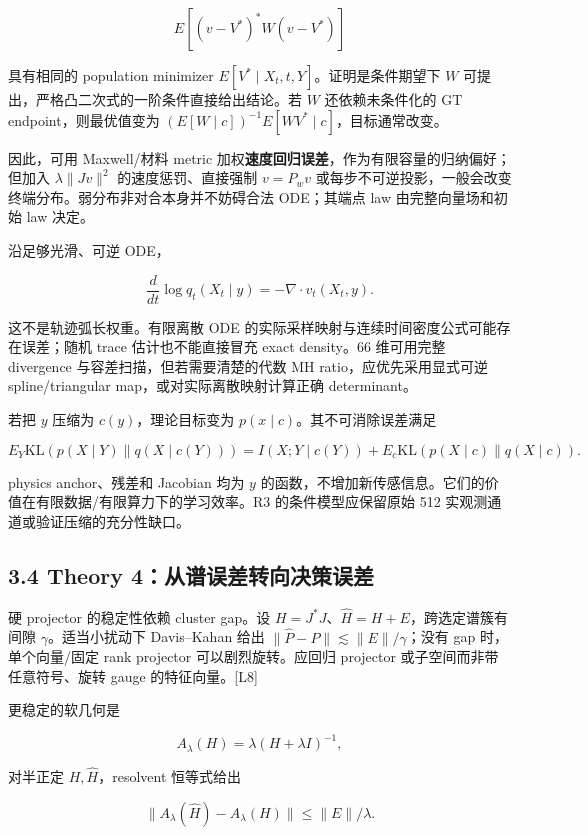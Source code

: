 \documentclass[
  11pt,
  a4paper,
]{article}
\begin{document}
\[E[(v-V^*)^*W(v-V^*)]\]

具有相同的 population minimizer \(E[V^*\mid X_t,t,Y]\)。证明是条件期望下
\(W\) 可提出，严格凸二次式的一阶条件直接给出结论。若 \(W\)
还依赖未条件化的 GT endpoint，则最优值变为
\((E[W\mid c])^{-1}E[WV^*\mid c]\)，目标通常改变。

因此，可用 Maxwell/材料 metric
加权\textbf{速度回归误差}，作为有限容量的归纳偏好；但加入
\(\lambda\|Jv\|^2\) 的速度惩罚、直接强制 \(v=P_wv\)
或每步不可逆投影，一般会改变终端分布。弱分布非对合本身并不妨碍合法
ODE；其端点 law 由完整向量场和初始 law 决定。

沿足够光滑、可逆 ODE，

\[\frac d{dt}\log q_t(X_t\mid y)=-\nabla\cdot v_t(X_t,y).\]

这不是轨迹弧长权重。有限离散 ODE
的实际采样映射与连续时间密度公式可能存在误差；随机 trace
估计也不能直接冒充 exact density。66 维可用完整 divergence
与容差扫描，但若需要清楚的代数 MH ratio，应优先采用显式可逆
spline/triangular map，或对实际离散映射计算正确 determinant。

若把 \(y\) 压缩为 \(c(y)\)，理论目标变为
\(p(x\mid c)\)。其不可消除误差满足

\[E_Y\mathrm{KL}(p(X\mid Y)\|q(X\mid c(Y)))
=I(X;Y\mid c(Y))+E_c\mathrm{KL}(p(X\mid c)\|q(X\mid c)).\]

physics anchor、残差和 Jacobian 均为 \(y\)
的函数，不增加新传感信息。它们的价值在有限数据/有限算力下的学习效率。R3
的条件模型应保留原始 512 实观测通道或验证压缩的充分性缺口。

\hypertarget{theory-4ux4eceux8c31ux8befux5deeux8f6cux5411ux51b3ux7b56ux8befux5dee}{%
\subsection{3.4 Theory
4：从谱误差转向决策误差}\label{theory-4ux4eceux8c31ux8befux5deeux8f6cux5411ux51b3ux7b56ux8befux5dee}}

硬 projector 的稳定性依赖 cluster gap。设
\(H=J^*J\)、\(\widehat H=H+E\)，跨选定谱簇有间隙
\(\gamma\)。适当小扰动下 Davis--Kahan 给出
\(\|\widehat P-P\|\lesssim\|E\|/\gamma\)；没有 gap 时，单个向量/固定
rank projector 可以剧烈旋转。应回归 projector
或子空间而非带任意符号、旋转 gauge 的特征向量。{[}L8{]}

更稳定的软几何是

\[A_\lambda(H)=\lambda(H+\lambda I)^{-1},\]

对半正定 \(H,\widehat H\)，resolvent 恒等式给出

\[\|A_\lambda(\widehat H)-A_\lambda(H)\|\le\|E\|/\lambda.\]
\end{document}
